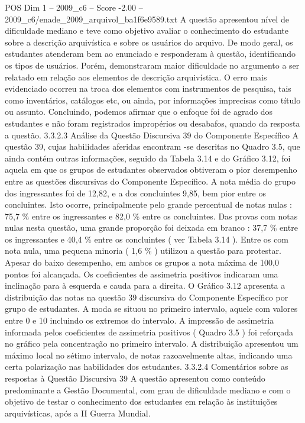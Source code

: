 \begin{textsample}{POS Dim 1 – 2009\_c6 – Score -2.00 – 2009\_c6/enade\_2009\_arquivol\_ba1f6e9589.txt}
A questão apresentou nível de dificuldade mediano e teve como objetivo avaliar o conhecimento do estudante sobre a descrição arquivística e sobre os usuários do arquivo.
De modo geral, os estudantes atenderam bem ao enunciado e responderam à questão, identificando os tipos de usuários.
Porém, demonstraram maior dificuldade no argumento a ser relatado em relação aos elementos de descrição arquivística.
O erro mais evidenciado ocorreu na troca dos elementos com instrumentos de pesquisa, tais como inventários, catálogos etc, ou ainda, por informações imprecisas como título ou assunto.
Concluindo, podemos afirmar que o enfoque foi de agrado dos estudantes e não foram registrados impropérios ou desabafos, quando da resposta a questão. 3.3.2.3 Análise da Questão Discursiva 39 do Componente Específico A questão 39, cujas habilidades aferidas encontram -se descritas no Quadro 3.5, que ainda contém outras informações, seguido da Tabela 3.14 e do Gráfico 3.12, foi aquela em que os grupos de estudantes observados obtiveram o pior desempenho entre as questões discursivas do Componente Específico.
A nota média do grupo dos ingressantes foi de 12,82, e a dos concluintes 9,85, bem pior entre os concluintes.
Isto ocorre, principalmente pelo grande percentual de notas nulas : 75,7 \% entre os ingressantes e 82,0 \% entre os concluintes.
Das provas com notas nulas nesta questão, uma grande proporção foi deixada em branco : 37,7 \% entre os ingressantes e 40,4 \% entre os concluintes ( ver Tabela 3.14 ).
Entre os com nota nula, uma pequena minoria ( 1,6 \% ) utilizou a questão para protestar.
Apesar do baixo desempenho, em ambos os grupos a nota máxima de 100,0 pontos foi alcançada.
Os coeficientes de assimetria positivos indicaram uma inclinação para à esquerda e cauda para a direita.
O Gráfico 3.12 apresenta a distribuição das notas na questão 39 discursiva do Componente Específico por grupo de estudantes.
A moda se situou no primeiro intervalo, aquele com valores entre 0 e 10 incluindo os extremos do intervalo.
A impressão de assimetria informada pelos coeficientes de assimetria positivos ( Quadro 3.5 ) foi reforçada no gráfico pela concentração no primeiro intervalo.
A distribuição apresentou um máximo local no sétimo intervalo, de notas razoavelmente altas, indicando uma certa polarização nas habilidades dos estudantes. 3.3.2.4 Comentários sobre as respostas à Questão Discursiva 39 A questão apresentou como conteúdo predominante a Gestão Documental, com grau de dificuldade mediano e com o objetivo de testar o conhecimento dos estudantes em relação às instituições arquivísticas, após a II Guerra Mundial.

\end{textsample}
